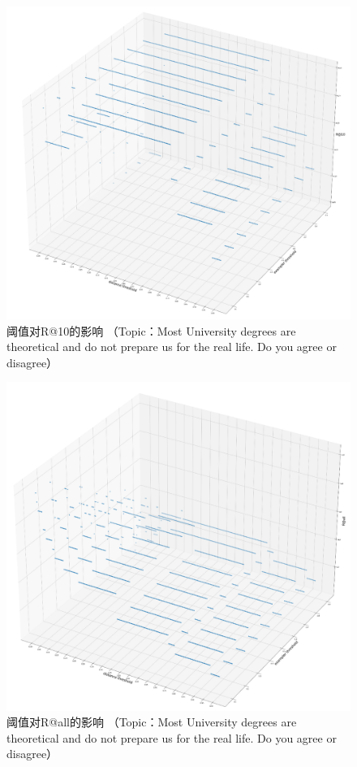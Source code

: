 \documentclass[11pt]{article}
\begin{document}
\begin{CJK}{UTF8}{gkai}
\begin{figure}[htbp]\small
  \centering
  \includegraphics[width=1.0\linewidth]{r@10.png}
  \caption{阈值对R@10的影响 （Topic：Most University degrees are theoretical and do not prepare us for the real life. Do you agree or disagree）}
  \label{framework}
\end{figure}

\begin{figure}[htbp]\small
  \centering
  \includegraphics[width=1.0\linewidth]{r@all.png}
  \caption{阈值对R@all的影响 （Topic：Most University degrees are theoretical and do not prepare us for the real life. Do you agree or disagree）}
  \label{framework}
\end{figure}


\end{CJK}
\end{document}
